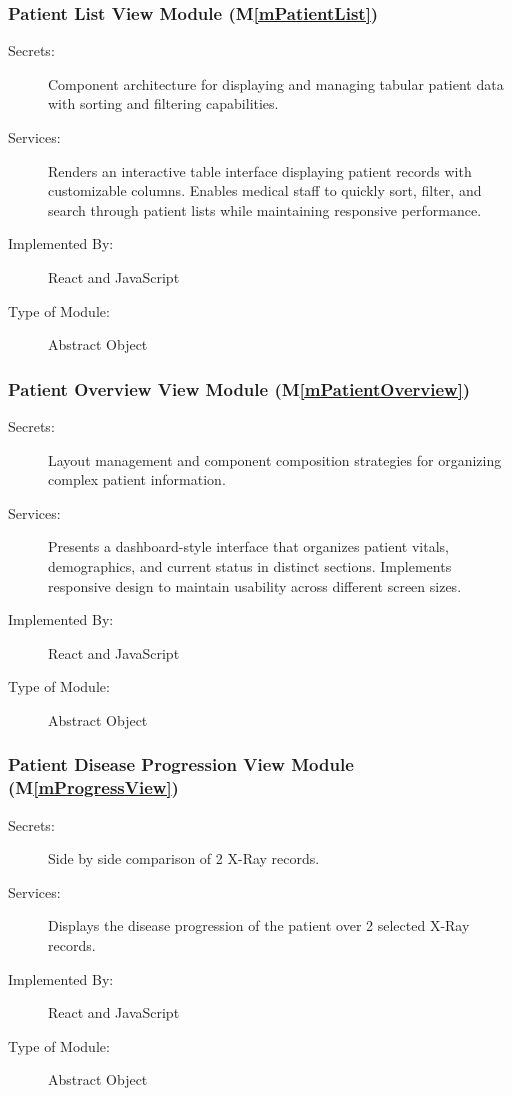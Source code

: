 \documentclass[12pt, titlepage]{article}
\newcommand{\mref}[1]{M\ref{#1}}
\begin{document}
\subsubsection{Patient List View Module (\mref{mPatientList})}
\begin{description}
\item[Secrets:] Component architecture for displaying and managing tabular patient data with sorting and filtering capabilities.
\item[Services:] Renders an interactive table interface displaying patient records with customizable columns. Enables medical staff to quickly sort, filter, and search through patient lists while maintaining responsive performance.
\item[Implemented By:] React and JavaScript
\item[Type of Module:] Abstract Object
\end{description}

\subsubsection{Patient Overview View Module (\mref{mPatientOverview})}
\begin{description}
\item[Secrets:] Layout management and component composition strategies for organizing complex patient information.
\item[Services:] Presents a dashboard-style interface that organizes patient vitals, demographics, and current status in distinct sections. Implements responsive design to maintain usability across different screen sizes.
\item[Implemented By:] React and JavaScript
\item[Type of Module:] Abstract Object
\end{description}

\subsubsection{Patient Disease Progression View Module (\mref{mProgressView})}
\begin{description}
\item[Secrets:] Side by side comparison of 2 X-Ray records.
\item[Services:] Displays the disease progression of the patient over 2 selected X-Ray records.
\item[Implemented By:] React and JavaScript
\item[Type of Module:] Abstract Object
\end{description}
\end{document}
